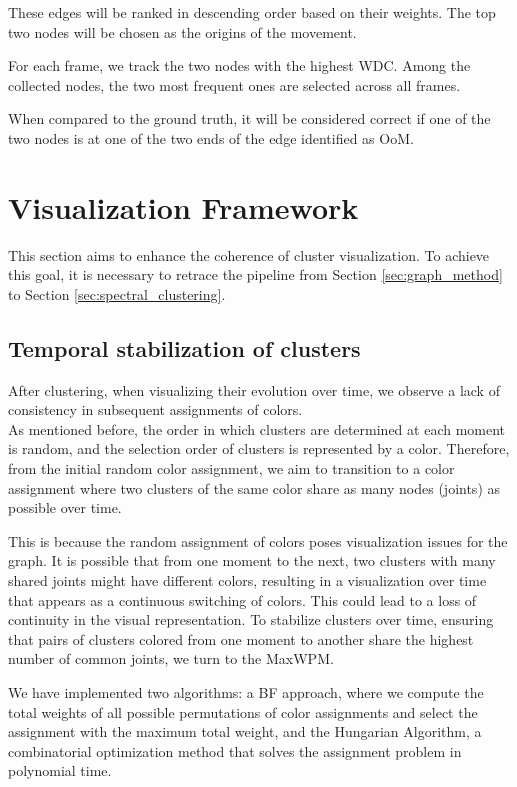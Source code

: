 These edges will be ranked in descending order based on their weights. The top two nodes will be chosen as the origins of the movement.

For each frame, we track the two nodes with the highest WDC. Among the collected nodes, the two most frequent ones are selected across all frames.

When compared to the ground truth, it will be considered correct if one of the two nodes is at one of the two ends of the edge identified as OoM.

\clearpage

\section{Visualization Framework}
This section aims to enhance the coherence of cluster visualization.
To achieve this goal, it is necessary to retrace the pipeline from Section \ref{sec:graph_method} to Section \ref{sec:spectral_clustering}.

\subsection{Temporal stabilization of clusters}
\label{subsec:clustering_stabilization}

After clustering, when visualizing their evolution over time, we observe a lack of consistency in subsequent assignments of colors. \\
As mentioned before, the order in which clusters are determined at each moment is random, and the selection order of clusters is represented by a color.
Therefore, from the initial random color assignment, we aim to transition to a color assignment where two clusters of the same color share as many nodes (joints) as possible over time.

This is because the random assignment of colors poses visualization issues for the graph.
It is possible that from one moment to the next, two clusters with many shared joints might have different colors, resulting in a visualization over time that appears as a continuous switching of colors. This could lead to a loss of continuity in the visual representation.
To stabilize clusters over time, ensuring that pairs of clusters colored from one moment to another share the highest number of common joints, we turn to the MaxWPM.

We have implemented two algorithms: a BF approach, where we compute the total weights of all possible permutations of color assignments and select the assignment with the maximum total weight, and the Hungarian Algorithm, a combinatorial optimization method that solves the assignment problem in polynomial time.

